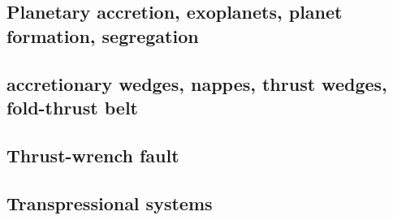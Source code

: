 {\scriptsize
\noindent
\cite{begl94b}
\cite{belg95a}
\cite{belg95b}
\cite{bekf96}\cite{como96}
\cite{bekk97}
\cite{pobe98}
}

\subsection{Planetary accretion, exoplanets, planet formation, segregation}

{\scriptsize
\noindent
\cite{lejm08}
\cite{ligt09}\cite{gogk09}
\cite{vayb10}
\cite{ligt11}\cite{vacg11}
\cite{vagc13}
\cite{gobg14}\cite{yadl14}
\cite{neum19}\cite{vayu19}
}

\subsection{accretionary wedges, nappes, thrust wedges, fold-thrust belt} 

{\scriptsize
\noindent
\cite{stoc83}\cite{dasd83}
\cite{dahl84}\cite{dasd84}
\cite{dahl90}
\cite{koon94}
\cite{wiep03}\cite{smbs03}
\cite{simp06}
\cite{rugb13}
\cite{mauw16}
\cite{mauw17}\cite{rugb17}
\cite{elgb19}
}

\subsection{Thrust-wrench fault} 

{\scriptsize
\noindent
\cite{rods15}
}

\subsection{Transpressional systems} 

